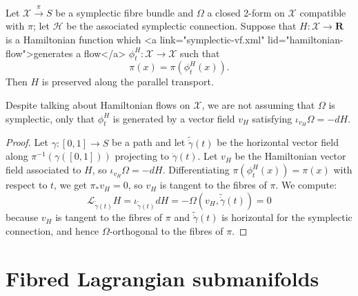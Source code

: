 \documentclass{article}
\begin{document}
\begin{Lemma}[lmaconserved]
Let $\mathcal{X}\stackrel{\pi}{\to}S$ be a symplectic fibre bundle and $\Omega$ a closed 2-form on $\mathcal{X}$ compatible with $\pi$; let $\mathcal{H}$ be the associated symplectic connection. Suppose that $H\colon\mathcal{X}\to\mathbf{R}$ is a Hamiltonian function which <a link="symplectic-vf.xml" lid="hamiltonian-flow">generates a flow</a> $\phi^H_t\colon\mathcal{X}\to\mathcal{X}$ such that
\[\pi(x)=\pi(\phi^H_t(x)).\]
Then $H$ is preserved along the parallel transport.
\end{Lemma}
\begin{Remark}
Despite talking about Hamiltonian flows on $\mathcal{X}$, we are not assuming that $\Omega$ is symplectic, only that $\phi^H_t$ is generated by a vector field $v_H$ satisfying $\iota_{v_H}\Omega=-dH$.
\end{Remark}
\begin{proof}
Let $\gamma\colon[0,1]\to S$ be a path and let $\widetilde{\dot{\gamma}}(t)$ be the horizontal vector field along $\pi^{-1}(\gamma([0,1]))$ projecting to $\dot{\gamma}(t)$. Let $v_H$ be the Hamiltonian vector field associated to $H$, so $\iota_{v_H}\Omega=-dH$. Differentiating $\pi(\phi^H_t(x))=\pi(x)$ with respect to $t$, we get $\pi_*v_H=0$, so $v_H$ is tangent to the fibres of $\pi$. We compute:
\[\mathcal{L}_{\widetilde{\dot{\gamma}}(t)}H=\iota_{\widetilde{\dot{\gamma}}(t)}dH=-\Omega\left(v_H,\widetilde{\dot{\gamma}}(t)\right)=0\]
because $v_H$ is tangent to the fibres of $\pi$ and $\widetilde{\dot{\gamma}}(t)$ is horizontal for the symplectic connection, and hence $\Omega$-orthogonal to the fibres of $\pi$.
\end{proof}

\section{Fibred Lagrangian submanifolds}
\end{document}
